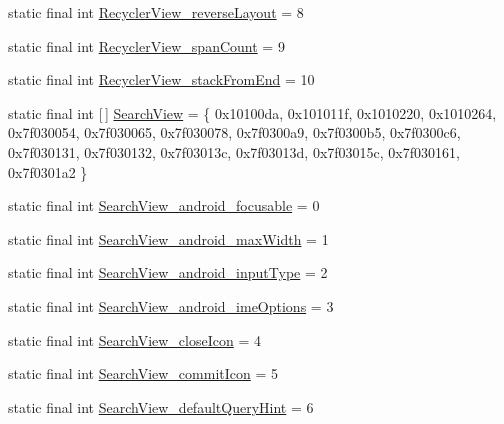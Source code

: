 \begin{DoxyCompactItemize}
\item 
static final int \mbox{\hyperlink{classcom_1_1synnapps_1_1carouselview_1_1_r_1_1styleable_a1f7dffed6a1acc58598d7eca56d9219e}{Recycler\+View\+\_\+reverse\+Layout}} = 8
\item 
static final int \mbox{\hyperlink{classcom_1_1synnapps_1_1carouselview_1_1_r_1_1styleable_acae2d9a24110c4f75452c64be714eacf}{Recycler\+View\+\_\+span\+Count}} = 9
\item 
static final int \mbox{\hyperlink{classcom_1_1synnapps_1_1carouselview_1_1_r_1_1styleable_aebefb9bf8963736a5b8187c755fe9ce5}{Recycler\+View\+\_\+stack\+From\+End}} = 10
\item 
static final int \mbox{[}$\,$\mbox{]} \mbox{\hyperlink{classcom_1_1synnapps_1_1carouselview_1_1_r_1_1styleable_aa64488f0a9e7f065a622e117e2f76bc9}{Search\+View}} = \{ 0x10100da, 0x101011f, 0x1010220, 0x1010264, 0x7f030054, 0x7f030065, 0x7f030078, 0x7f0300a9, 0x7f0300b5, 0x7f0300c6, 0x7f030131, 0x7f030132, 0x7f03013c, 0x7f03013d, 0x7f03015c, 0x7f030161, 0x7f0301a2 \}
\item 
static final int \mbox{\hyperlink{classcom_1_1synnapps_1_1carouselview_1_1_r_1_1styleable_ae83c47f2723b80e53148432a7da36671}{Search\+View\+\_\+android\+\_\+focusable}} = 0
\item 
static final int \mbox{\hyperlink{classcom_1_1synnapps_1_1carouselview_1_1_r_1_1styleable_a387a6dc5f4daf43a6b6ff799b037700c}{Search\+View\+\_\+android\+\_\+max\+Width}} = 1
\item 
static final int \mbox{\hyperlink{classcom_1_1synnapps_1_1carouselview_1_1_r_1_1styleable_a1a498fec6503ae919d4a8eddfab1f7b8}{Search\+View\+\_\+android\+\_\+input\+Type}} = 2
\item 
static final int \mbox{\hyperlink{classcom_1_1synnapps_1_1carouselview_1_1_r_1_1styleable_a0b3b9355e0543379487bb7eada6aa604}{Search\+View\+\_\+android\+\_\+ime\+Options}} = 3
\item 
static final int \mbox{\hyperlink{classcom_1_1synnapps_1_1carouselview_1_1_r_1_1styleable_a25b9e2a6a90f5c000911085c477f9c6c}{Search\+View\+\_\+close\+Icon}} = 4
\item 
static final int \mbox{\hyperlink{classcom_1_1synnapps_1_1carouselview_1_1_r_1_1styleable_a21f347446ef11869ca6f47ffdfaca499}{Search\+View\+\_\+commit\+Icon}} = 5
\item 
static final int \mbox{\hyperlink{classcom_1_1synnapps_1_1carouselview_1_1_r_1_1styleable_a7577d7ecaadba61861e2ed9b6e490858}{Search\+View\+\_\+default\+Query\+Hint}} = 6
\item 

\end{DoxyCompactItemize}

